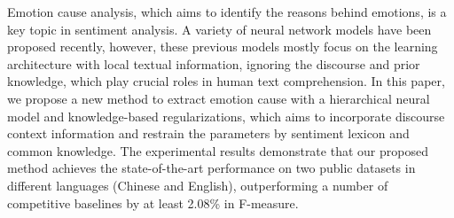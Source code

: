 Emotion cause analysis, which aims to identify the reasons behind emotions, is a key topic in sentiment analysis. A variety of neural network models have been proposed recently, however, these previous models mostly focus on the learning architecture with local textual information, ignoring the discourse and prior knowledge, which play crucial roles in human text comprehension. In this paper, we propose a new method to extract emotion cause with a hierarchical neural model and knowledge-based regularizations, which aims to incorporate discourse context information and restrain the parameters by sentiment lexicon and common knowledge. The experimental results demonstrate that our proposed method achieves the state-of-the-art performance on two public datasets in different languages (Chinese and English), outperforming a number of competitive baselines by at least 2.08\% in F-measure.